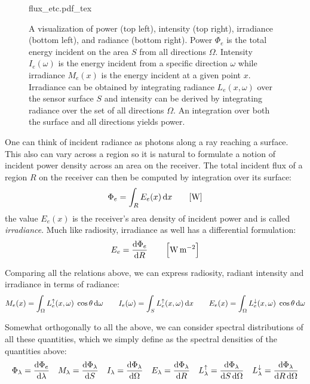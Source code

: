 \begin{figure}[tb]
    \centering
    \def\svgwidth{\linewidth}
    {flux_etc.pdf_tex}
    \caption{\label{fig:flux_etc}%
    A visualization of power (top left), intensity (top right),
    irradiance (bottom left), and radiance (bottom right).
    Power $\Phi_e$ is the total energy incident on the area $S$ from all directions
    $\Omega$. Intensity $I_e(\omega)$ is the energy incident from a specific direction $\omega$
    while irradiance $M_e(x)$ is the energy incident at a given point $x$.
    Irradiance can be obtained by integrating radiance $L_e(x,\omega)$ over the sensor
    surface $S$ and intensity can be derived by integrating radiance over the set of
    all directions $\Omega$. An integration over both the surface and all directions yields power.  }
\end{figure}

One can think of incident radiance as photons along a ray reaching a surface.
This also can vary across a region so it is natural to formulate a notion
of incident power density across an area on the receiver.
The total incident flux of a region $R$ on the receiver can then be computed by
integration over its surface:
\begin{displaymath}
\Phi_e = \int_{R} E_e(x) \mathop{}\!\mathrm{d} x \qquad [\si{\watt}]
\end{displaymath}
the value $E_e(x)$ is the receiver's area density of incident power and
is called \textit{irradiance}.
Much like radiosity, irradiance as well has a differential formulation:
\begin{displaymath}
E_e = \frac{\mathop{}\!\mathrm{d}\Phi_e}{\mathop{}\!\mathrm{d} R} \qquad \left[\si{\watt\per\square\meter}\right]
\end{displaymath}

Comparing all the relations above, we can express radiosity, radiant intensity
and irradiance in terms of radiance:
\begin{displaymath}
M_e(x) = \int_\Omega L_e^\uparrow(x,\omega) \;\cos\theta \mathop{}\!\mathrm{d}\omega \qquad
I_e(\omega) = \int_S L_e^\uparrow(x,\omega) \mathop{}\!\mathrm{d} x \qquad
E_e(x) = \int_\Omega L_e^\downarrow(x,\omega) \;\cos\theta \mathop{}\!\mathrm{d}\omega
\end{displaymath}

Somewhat orthogonally to all the above, we can consider spectral distributions
of all these quantities, which we simply define as the spectral densities of the
quantities above:
\begin{displaymath}
\Phi_{\lambda} = \frac{\d\Phi_e}{\d\lambda} \quad
M_{\lambda} = \frac{\d\Phi_{\lambda}}{\d S} \quad
I_{\lambda} = \frac{\d\Phi_{\lambda}}{\d\Omega} \quad
E_{\lambda} = \frac{\d\Phi_{\lambda}}{\d R} \quad
L_{\lambda}^\uparrow = \frac{\d\Phi_{\lambda}}{\d S \d\Omega} \quad
L_{\lambda}^\downarrow = \frac{\d\Phi_{\lambda}}{\d R \d\Omega}
\end{displaymath}



